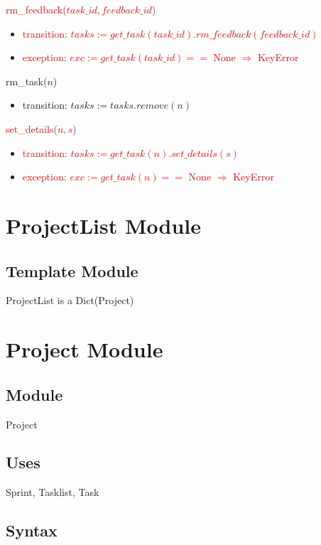 \documentclass[12pt, titlepage]{article}
\begin{document}
\noindent \textcolor{red}{rm\_feedback($task\_id, feedback\_id$)}
\begin{itemize}
    \item \textcolor{red}{transition: $tasks := get\_task(task\_id).rm\_feedback(feedback\_id)$}
    \item \textcolor{red}{exception: $exc := get\_task(task\_id) ==$ None $\Rightarrow$ KeyError}
\end{itemize}

\noindent rm\_task($n$)
\begin{itemize}
    \item transition: $tasks := tasks.remove(n)$
\end{itemize}

\noindent \textcolor{red}{set\_details($n, s$)}
\begin{itemize}
    \item \textcolor{red}{transition: $tasks := get\_task(n).set\_details(s)$}
    \item \textcolor{red}{exception: $exc := get\_task(n) ==$ None $\Rightarrow$ KeyError}
\end{itemize}
\newpage

\section* {ProjectList Module}

\subsection*{Template Module}
ProjectList is a Dict(Project)

\newpage

\section* {Project Module}

\subsection*{Module}
Project

\subsection* {Uses}
Sprint, Tasklist, Task

\subsection* {Syntax}
\end{document}
